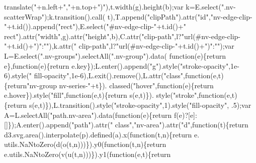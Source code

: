 \begin{DoxyCode}
{{      translate("}+n.left+\textcolor{stringliteral}{","}+n.top+\textcolor{stringliteral}{")"}),t.width(g).height(b);var k=E.select(\textcolor{stringliteral}{".nv-scatterWrap"});k.transition().call(
      t),T.append(\textcolor{stringliteral}{"clipPath"}).attr(\textcolor{stringliteral}{"id"},\textcolor{stringliteral}{"nv-edge-clip-"}+t.id()).append(\textcolor{stringliteral}{"rect"}),E.select(\textcolor{stringliteral}{"#nv-edge-clip-"}+t.id()+\textcolor{stringliteral}{"
       rect"}).attr(\textcolor{stringliteral}{"width"},g).attr(\textcolor{stringliteral}{"height"},b),C.attr(\textcolor{stringliteral}{"clip-path"},l?\textcolor{stringliteral}{"url(#nv-edge-clip-"}+t.id()+\textcolor{stringliteral}{")"}:\textcolor{stringliteral}{""}),k.attr(\textcolor{stringliteral}{"
      clip-path"},l?\textcolor{stringliteral}{"url(#nv-edge-clip-"}+t.id()+\textcolor{stringliteral}{")"}:\textcolor{stringliteral}{""});var L=E.select(\textcolor{stringliteral}{".nv-groups"}).selectAll(\textcolor{stringliteral}{".nv-group"}).data(\textcolor{keyword}{
      function}(e)\{\textcolor{keywordflow}{return} e\},\textcolor{keyword}{function}(e)\{\textcolor{keywordflow}{return} e.key\});L.enter().append(\textcolor{stringliteral}{"g"}).style(\textcolor{stringliteral}{"stroke-opacity"},1e-6).style(\textcolor{stringliteral}{"
      fill-opacity"},1e-6),L.exit().remove(),L.attr(\textcolor{stringliteral}{"class"},\textcolor{keyword}{function}(e,t)\{\textcolor{keywordflow}{return}\textcolor{stringliteral}{"nv-group nv-series-"}+t\}).
      classed(\textcolor{stringliteral}{"hover"},\textcolor{keyword}{function}(e)\{\textcolor{keywordflow}{return} e.hover\}).style(\textcolor{stringliteral}{"fill"},\textcolor{keyword}{function}(e,t)\{\textcolor{keywordflow}{return} s(e,t)\}).
      style(\textcolor{stringliteral}{"stroke"},\textcolor{keyword}{function}(e,t)\{\textcolor{keywordflow}{return} s(e,t)\}),L.transition().style(\textcolor{stringliteral}{"stroke-opacity"},1).style(\textcolor{stringliteral}{"fill-opacity"},
      .5);var A=L.selectAll(\textcolor{stringliteral}{"path.nv-area"}).data(\textcolor{keyword}{function}(e)\{\textcolor{keywordflow}{return} f(e)?[e]:[]\});A.enter().append(\textcolor{stringliteral}{"path"}).attr(\textcolor{stringliteral}{"
      class"},\textcolor{stringliteral}{"nv-area"}).attr(\textcolor{stringliteral}{"d"},\textcolor{keyword}{function}(t)\{\textcolor{keywordflow}{return} d3.svg.area().interpolate(p).defined(a).x(\textcolor{keyword}{function}(t,n)\{\textcolor{keywordflow}{return} 
      e.
utils.NaNtoZero(d(o(t,n)))\}).y0(\textcolor{keyword}{function}(t,n)\{\textcolor{keywordflow}{return} e.utils.NaNtoZero(v(u(t,n)))\}).y1(\textcolor{keyword}{function}(e,t)\{\textcolor{keywordflow}{return}
}
\end{DoxyCode}
